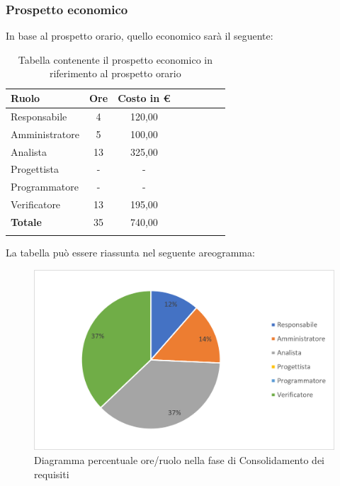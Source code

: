 			\subsubsection{Prospetto economico}
			In base al prospetto orario, quello economico sarà il seguente: 
			
			\begin{longtable}{|l|c|c|c|c|c|c|c|}
				\hline
				\rowcolor{lighter-grayer}
				\textbf{Ruolo} & \textbf{Ore} & \textbf{Costo in €} \\
				\hline
				\endfirsthead
				
				\hline
				Responsabile & 4 & 120,00\\
				\hline
				\hline
				Amministratore & 5 & 100,00\\
				\hline
				\hline
				Analista & 13 & 325,00\\
				\hline
				\hline
				Progettista & - & -\\
				\hline
				\hline
				Programmatore & - & -\\
				\hline
				\hline
				Verificatore & 13 & 195,00\\
				\hline
				\hline
				\textbf{Totale} & 35 & 740,00\\
				\hline
				\rowcolor{white}
				\caption{Tabella contenente il prospetto economico in riferimento al prospetto orario}
			\end{longtable}
			\pagebreak
		
			La tabella può essere riassunta nel seguente areogramma:
			\begin{figure}[H]
				\centering
				\includegraphics[width=0.8\linewidth]{res/images/preventivo/2-2.png}
				\caption{Diagramma percentuale ore/ruolo nella fase di Consolidamento dei requisiti}
				\label{fig:diagramma costi ruolo fase consolidamento dei requisiti}
            \end{figure}

